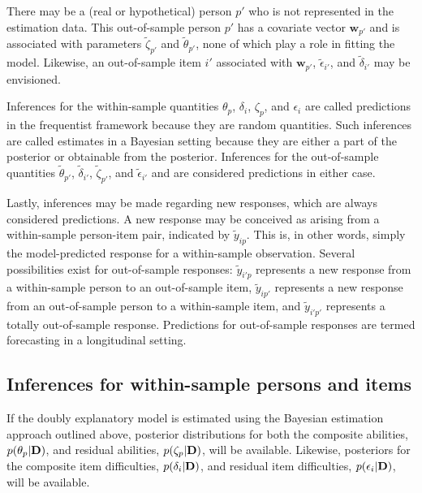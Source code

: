 \documentclass[12pt, letterpaper]{article}
\begin{document}
There may be a (real or hypothetical) person $p'$ who is not represented in the estimation data. This out-of-sample person $p'$ has a covariate vector $\mathbf{w}_{p'}$ and is associated with parameters $\tilde \zeta_{p'}$ and $\tilde \theta_{p'}$, none of which play a role in fitting the model. Likewise, an out-of-sample item $i'$ associated with $\mathbf{w}_{p'}$, $\tilde \epsilon_{i'}$, and $\tilde \delta_{i'}$ may be envisioned.

Inferences for the within-sample quantities $\theta_p$, $\delta_i$, $\zeta_p$, and $\epsilon_i$ are called predictions in the frequentist framework because they are random quantities. Such inferences are called estimates in a Bayesian setting because they are either a part of the posterior or obtainable from the posterior.  Inferences for the out-of-sample quantities $\tilde \theta_{p'}$, $\tilde \delta_{i'}$, $\tilde \zeta_{p'}$, and $\tilde \epsilon_{i'}$ and are considered predictions in either case.

Lastly, inferences may be made regarding new responses, which are always considered predictions. A new response may be conceived as arising from a within-sample person-item pair, indicated by $\tilde y_{ip}$. This is, in other words, simply the model-predicted response for a within-sample observation. Several possibilities exist for out-of-sample responses: $\tilde y_{i'p}$ represents a new response from a within-sample person to an out-of-sample item, $\tilde y_{ip'}$ represents a new response from an out-of-sample person to a within-sample item, and $\tilde y_{i'p'}$ represents a totally out-of-sample response. Predictions for out-of-sample responses are termed forecasting in a longitudinal setting.


\subsection{Inferences for within-sample persons and items}

If the doubly explanatory model is estimated using the Bayesian estimation approach outlined above, posterior distributions for both the composite abilities, $p(\theta_p | \mathbf{D})$, and residual abilities, $p(\zeta_p | \mathbf{D})$, will be available. Likewise, posteriors for the composite item difficulties, $p(\delta_i | \mathbf{D})$, and residual item difficulties, $p(\epsilon_i | \mathbf{D})$, will be available. 
\end{document}
